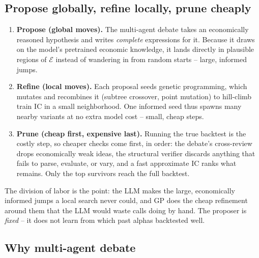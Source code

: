 \documentclass[11pt]{article}
\theoremstyle{definition}
\theoremstyle{plain}
\theoremstyle{remark}
\newcommand{\Expr}{\mathcal{E}}
\newcommand{\IC}{\mathrm{IC}}
\begin{document}
\subsection{Propose globally, refine locally, prune cheaply}
\label{sec:approx}

\begin{enumerate}[leftmargin=1.6em,itemsep=3pt]
  \item \textbf{Propose (global moves).} The multi-agent debate takes an economically reasoned
  hypothesis and writes \emph{complete} expressions for it. Because it draws on the model's
  pretrained economic knowledge, it lands directly in plausible regions of $\Expr$ instead of
  wandering in from random starts -- large, informed jumps.
  \item \textbf{Refine (local moves).} Each proposal seeds genetic programming, which mutates
  and recombines it (subtree crossover, point mutation) to hill-climb train $\IC$ in a small
  neighborhood. One informed seed thus spawns many nearby variants at no extra model cost --
  small, cheap steps.
  \item \textbf{Prune (cheap first, expensive last).} Running the true backtest is the costly
  step, so cheaper checks come first, in order: the debate's cross-review drops economically
  weak ideas, the structural verifier discards anything that fails to parse, evaluate, or vary,
  and a fast approximate $\IC$ ranks what remains. Only the top survivors reach the full
  backtest.
\end{enumerate}

The division of labor is the point: the LLM makes the large, economically informed jumps a
local search never could, and GP does the cheap refinement around them that the LLM would waste
calls doing by hand. The proposer is \emph{fixed} -- it does not learn from which past alphas
backtested well.

\subsection{Why multi-agent debate}
\label{sec:whydebate}
\end{document}
